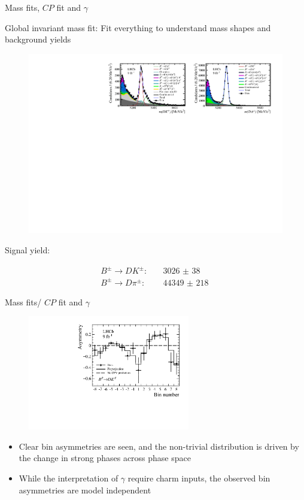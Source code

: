\documentclass{beamer}
\begin{document}
\begin{frame}{Mass fits, $C\!P$ fit and $\gamma$}
  \begin{center}
    \Large Global invariant mass fit: Fit everything to understand mass shapes and background yields
  \end{center}
  \begin{figure}
    \centering
    \includegraphics[width = 1.0\textwidth]{Plots/d2kkpipi_fiveL_allDP.pdf}
  \end{figure}
  \begin{center}
    Signal yield:
  \end{center}
  \vspace{-0.3cm}
  \begin{align*}
    B^\pm\to DK^\pm:&\quad \SI{3026(38)}{} \\
    B^\pm\to D\pi^\pm:&\quad \SI{44349(218)}{}
  \end{align*}
\end{frame}

\begin{frame}{Mass fits/ $C\!P$ fit and $\gamma$}
  \begin{figure}
    \includegraphics[height = 5cm]{Plots/BinAsymmetries_dk.pdf}
  \end{figure}
  \vspace{-0.3cm}
  \begin{itemize}
    \setlength\itemsep{0.5em}
    \item{Clear bin asymmetries are seen, and the non-trivial distribution is driven by the change in strong phases across phase space}
    \item{While the interpretation of $\gamma$ require charm inputs, the observed bin asymmetries are model independent}
  \end{itemize}
\end{frame}
\end{document}
